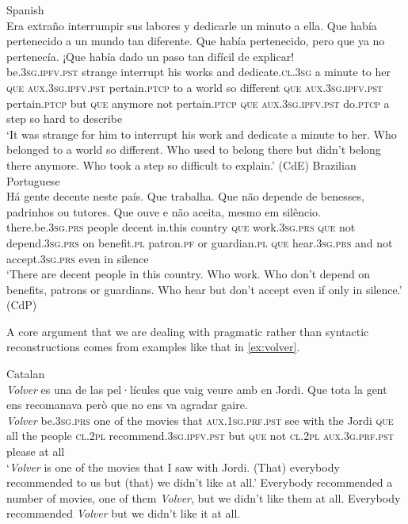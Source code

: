\ea 
\ea\label{ex:ellaa} 
 Spanish\\ 
\gll  Era extraño interrumpir sus labores y dedicarle
un minuto a ella. Que
había pertenecido a un mundo tan diferente. Que había pertenecido, pero que ya
no pertenecía. ¡Que había dado un paso tan difícil de explicar! \\
		be.\textsc{3sg.ipfv.pst} strange interrupt his works and dedicate.\textsc{cl.3sg} a minute to her \textsc{que} \textsc{aux.3sg.ipfv.pst} pertain.\textsc{ptcp} to a world so different \textsc{que} \textsc{aux.3sg.ipfv.pst} pertain.\textsc{ptcp} but \textsc{que} anymore not pertain.\textsc{ptcp} \textsc{que} \textsc{aux.3sg.ipfv.pst} do.\textsc{ptcp} a step so hard to describe\\
		\glt `It was strange for him to interrupt his work and dedicate a minute to her. Who
belonged to a world so different. Who used to belong there but didn’t belong
		there anymore. Who took a step so difficult to explain.' (CdE)
		\ex\label{ex:ellab} 
		 Brazilian Portuguese \\
		\gll  Há gente decente neste país. Que trabalha. Que não depende de benesses,
padrinhos ou tutores. Que ouve e não aceita, mesmo em silêncio. \\
		there.be.\textsc{3sg.prs} people decent in.this country \textsc{que} work.\textsc{3sg.prs}
\textsc{que} not depend.\textsc{3sg.prs} on benefit.\textsc{pl} patron.\textsc{pf} or guardian.\textsc{pl} \textsc{que} hear.\textsc{3sg.prs} and not accept.\textsc{3sg.prs} even in silence
\\
		\glt `There are decent people in this country. Who work. Who don’t depend on benefits,
	patrons or guardians. Who hear but don’t accept even if only in silence.' (CdP)
	\z
\z

A core argument that we are  dealing with pragmatic rather
than syntactic reconstructions  comes from examples like that in \eqref{ex:volver}.


\ea \label{ex:volver}
Catalan\\ 
 \gll \emph{Volver} es una de las pel·lícules que vaig veure amb en Jordi. Que tota la gent ens recomanava però que no ens va agradar gaire. \\
	\emph{Volver} be.\textsc{3sg.prs} one of the movies
	that \textsc{aux.1sg.prf.pst} see with the Jordi \textsc{que} all the people 	\textsc{cl.2pl} recommend.\textsc{3sg.ipfv.pst} but \textsc{que} not \textsc{cl.2pl} \textsc{aux.3g.prf.pst} please {at all}
\\
	\glt `\emph{Volver} is one of the movies that I saw with Jordi. (That) everybody recommended to
us but (that) we didn’t like at all.'
	\ea\label{ex:volvera} Everybody recommended a number of movies, one of them \emph{Volver}, but we didn’t
	like them at all.
	\ex\label{ex:volverb} Everybody recommended \emph{Volver} but we didn’t like it at all.
\z
\z 

